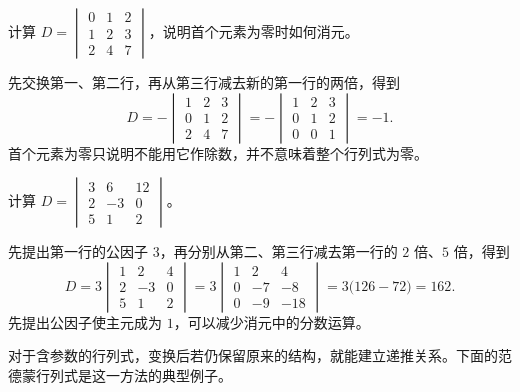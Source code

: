 \begin{example}
计算 $D=\begin{vmatrix}0&1&2\\1&2&3\\2&4&7\end{vmatrix}$，说明首个元素为零时如何消元。
\end{example}
\begin{solve}
先交换第一、第二行，再从第三行减去新的第一行的两倍，得到
\[
    D=-\begin{vmatrix}1&2&3\\0&1&2\\2&4&7\end{vmatrix}
     =-\begin{vmatrix}1&2&3\\0&1&2\\0&0&1\end{vmatrix}=-1.
\]
首个元素为零只说明不能用它作除数，并不意味着整个行列式为零。
\end{solve}

\begin{example}
计算 $D=\begin{vmatrix}3&6&12\\2&-3&0\\5&1&2\end{vmatrix}$。
\end{example}
\begin{solve}
先提出第一行的公因子 $3$，再分别从第二、第三行减去第一行的 $2$ 倍、$5$ 倍，得到
\[
    D=3\begin{vmatrix}1&2&4\\2&-3&0\\5&1&2\end{vmatrix}
     =3\begin{vmatrix}1&2&4\\0&-7&-8\\0&-9&-18\end{vmatrix}
     =3\bigl(126-72\bigr)=162.
\]
先提出公因子使主元成为 $1$，可以减少消元中的分数运算。
\end{solve}

对于含参数的行列式，变换后若仍保留原来的结构，就能建立递推关系。下面的范德蒙行列式是这一方法的典型例子。

